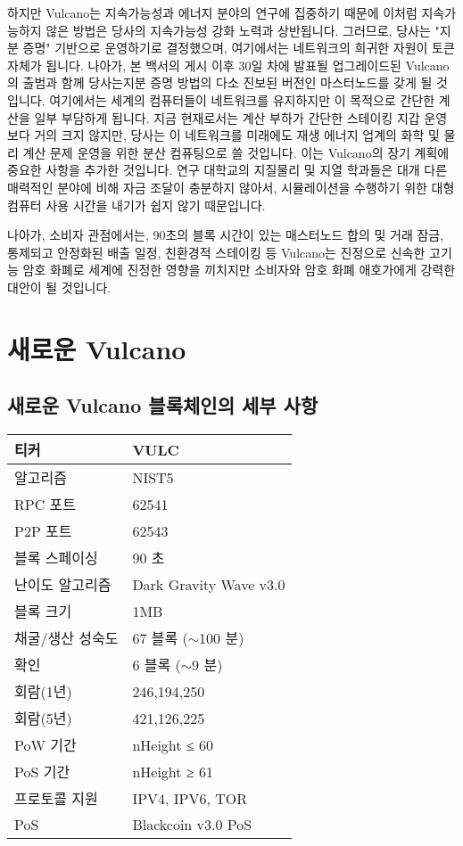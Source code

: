 \documentclass[A4paper, 12pt]{article}
\begin{document}
하지만 Vulcano는 지속가능성과 에너지 분야의 연구에 집중하기 때문에 이처럼 지속가능하지 않은 방법은 당사의 지속가능성 강화 노력과 상반됩니다. 그러므로, 당사는 "지분 증명" 기반으로 운영하기로 결정했으며, 여기에서는 네트워크의 희귀한 자원이 토큰 자체가 됩니다. 나아가, 본 백서의 게시 이후 30일 차에 발표될 업그레이드된 Vulcano의 출범과 함께 당사는지분 증명 방법의 다소 진보된 버전인 마스터노드를 갖게 될 것입니다. 여기에서는 세계의 컴퓨터들이 네트워크를 유지하지만 이 목적으로 간단한 계산을 일부 부담하게 됩니다. 지금 현재로서는 계산 부하가 간단한 스테이킹 지갑 운영보다 거의 크지 않지만, 당사는 이 네트워크를 미래에도 재생 에너지 업계의 화학 및 물리 계산 문제 운영을 위한 분산 컴퓨팅으로 쓸 것입니다.  이는 Vulcano의 장기 계획에 중요한 사항을 추가한 것입니다. 연구 대학교의 지질물리 및 지열 학과들은 대개 다른 매력적인 분야에 비해 자금 조달이 충분하지 않아서, 시뮬레이션을 수행하기 위한 대형 컴퓨터 사용 시간을 내기가 쉽지 않기 때문입니다.

나아가, 소비자 관점에서는, 90초의 블록 시간이 있는 매스터노드 합의 및 거래 잠금, 통제되고 안정화된 배출 일정, 친환경적 스테이킹 등 Vulcano는 진정으로 신속한 고기능 암호 화폐로 세계에 진정한 영향을 끼치지만 소비자와 암호 화폐 애호가에게 강력한 대안이 될 것입니다.

\section{새로운 Vulcano}
\subsection{새로운 Vulcano 블록체인의 세부 사항}

\begin{table}[h]
\centering
\begin{tabular}{@{}ll@{}}
\toprule
티커 & VULC \\ \midrule
알고리즘 & NIST5 \\
RPC 포트 & 62541 \\
P2P 포트 & 62543 \\
블록 스페이싱 & 90 초 \\
난이도 알고리즘 & Dark Gravity Wave v3.0 \\
블록 크기 & 1MB \\
채굴/생산 성숙도 & 67 블록 ($\sim$100 분) \\
확인 & 6 블록 ($\sim$9 분) \\
회람(1년) & 246,194,250 \\
회람(5년) & 421,126,225 \\
PoW 기간 & nHeight ≤ 60 \\
PoS 기간 & nHeight ≥ 61 \\
프로토콜 지원 & IPV4, IPV6, TOR \\
PoS & Blackcoin v3.0 PoS \\ \bottomrule
\end{tabular}
\end{table}
\end{document}
